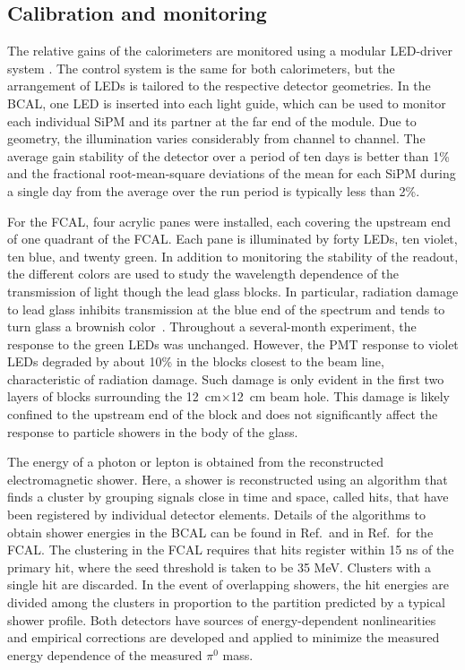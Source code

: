 \subsection[Calibration and monitoring]{Calibration and monitoring \label{sec:calcalib}}
The relative gains of the calorimeters are monitored using a modular LED-driver system \cite{Anassontzis201441}. The control system is the same for both calorimeters, but the arrangement of LEDs is tailored to the respective detector geometries. In the BCAL, one LED is inserted into each light guide, which can be used to monitor each individual SiPM and its partner at the far end of the module.
Due to geometry, the illumination varies considerably from channel to channel. 
The average gain stability of the detector over a period of ten days is better than 1\% and the fractional root-mean-square deviations of the mean for each SiPM during a single day from the average over the run period is typically less than 2\%.

For the FCAL, four acrylic panes were installed, each covering the upstream end of one quadrant of the FCAL. Each pane is illuminated by forty LEDs, ten violet, ten blue, and twenty green. In addition to monitoring the stability of the readout, the different colors are used to study the wavelength dependence of the transmission of light though the lead glass blocks.  In particular, radiation damage to lead glass inhibits transmission at the blue end of the spectrum and tends to turn glass a brownish color~\cite{Schaefer:2011gw}. Throughout a several-month experiment, the response to the green LEDs was unchanged. However, the PMT response to violet LEDs degraded by about 10\% in the blocks closest to the beam line, characteristic of radiation damage.  Such damage is only evident in the first two layers of blocks surrounding the 12~cm$\times$12~cm beam hole. This damage is likely confined to the upstream end of the block and does not significantly affect the response to particle showers in the body of the glass.

The energy of a photon or lepton is obtained from the reconstructed electromagnetic shower. Here, a shower is reconstructed using an algorithm that finds a cluster by grouping signals close in time and space, called hits, that have been registered by individual detector elements.
Details of the algorithms to obtain shower energies in the BCAL can be found in Ref.\,\cite{BEATTIE201824}  and in Ref.\,\cite{Jones:2006ru} for the FCAL. The clustering in the FCAL requires that hits register within 15 ns of the primary hit, where the seed threshold is taken to be 35 MeV. Clusters with a single hit are discarded. In the event of overlapping showers, the hit energies are divided among the clusters in proportion to the partition predicted by a typical shower profile. Both detectors have sources of energy-dependent nonlinearities and empirical corrections are developed and applied to minimize the measured energy dependence of the measured $\pi^0$ mass.  


